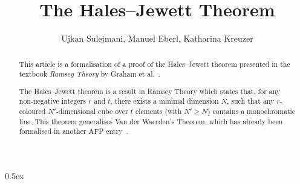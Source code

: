 \documentclass[11pt,a4paper]{article}
\begin{document}
\title{The Hales--Jewett Theorem}
\author{Ujkan Sulejmani, Manuel Eberl, Katharina Kreuzer}
\maketitle

\begin{abstract}
    This article is a formalisation of a proof of the Hales--Jewett theorem presented in the textbook \emph{Ramsey Theory} by Graham et al.~\cite{thebook}.
    
    The Hales--Jewett theorem is a result in Ramsey Theory which states that, for any non-negative integers $r$ and $t$, there exists a minimal dimension $N$, such that any $r$-coloured $N'$-dimensional cube over $t$ elements (with $N' \geq N$) contains a monochromatic line. This theorem generalises Van der Waerden's Theorem, which has already been formalised in another AFP entry~\cite{vdw}.
\end{abstract}


\newpage
\tableofcontents

\newpage
\parindent 0pt\parskip 0.5ex



\nocite{vdw}


\end{document}
